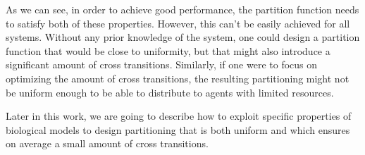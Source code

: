 As we can see, in order to achieve good performance, the partition function needs to satisfy both of these properties. However, this can't be easily achieved for all systems. Without any prior knowledge of the system, one could design a partition function that would be close to uniformity, but that might also introduce a significant amount of cross transitions. Similarly, if one were to focus on optimizing the amount of cross transitions, the resulting partitioning might not be uniform enough to be able to distribute to agents with limited resources.

Later in this work, we are going to describe how to exploit specific properties of biological models to design partitioning that is both uniform and which ensures on average a small amount of cross transitions.